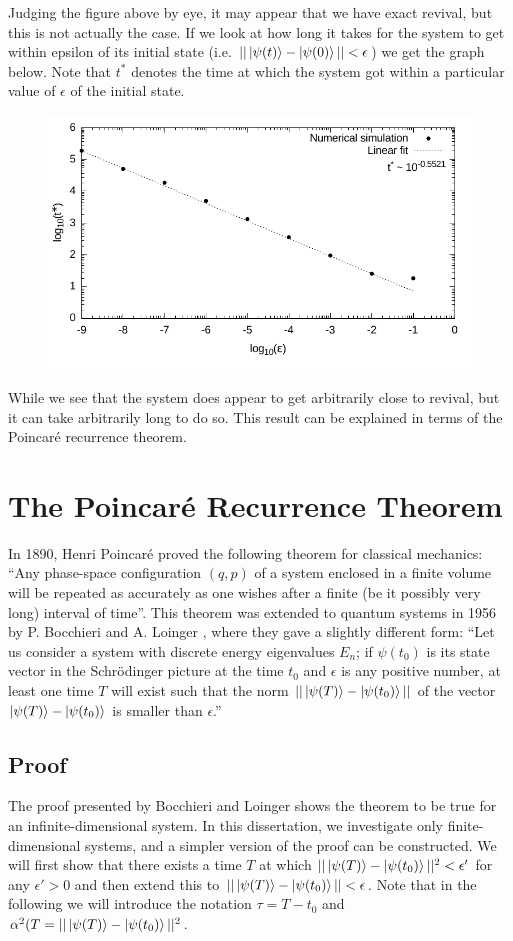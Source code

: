 \documentclass[a4paper,10pt]{article}
\begin{document}
Judging the figure above by eye, it may appear that we have exact revival, but this is not actually the case. If we look at how long it takes for the system to get within epsilon of
its initial state (i.e. $||\ket{\psi(t)}-\ket{\psi(0)}||<\epsilon$)
we get the graph below. Note that $t^*$ denotes the time at which the system got within a particular value of $\epsilon$ of the initial state.
\begin{figure}[H]
 \includegraphics[width=1.0\textwidth]{recurrence_times}
 \centering
\end{figure}
While we see that the system does appear to get arbitrarily close to revival, but it can take arbitrarily long to do so. This result can be explained in terms of the Poincar\'e recurrence theorem.
\newpage
\section{The Poincar\'e Recurrence Theorem}

In 1890, Henri Poincar\'e proved the following theorem for classical mechanics: ``Any phase-space configuration $(q,p)$ of a system enclosed in a finite volume will be repeated as accurately as one wishes
after a finite (be it possibly very long) interval of time''. This theorem was extended to quantum systems in 1956 by P. Bocchieri and A. Loinger \cite{Bocchieri1957}, where they gave a slightly different
form: ``Let us consider a system with discrete energy eigenvalues $E_n$; if $\psi(t_0)$ is its state vector in the Schr{\"o}dinger picture at the time $t_0$ and $\epsilon$ is any positive number, at 
least one time $T$ will exist such that the norm $||\ket{\psi(T)}-\ket{\psi(t_0)}||$ of the vector $\ket{\psi(T)}-\ket{\psi(t_{0})}$ is smaller than $\epsilon$.''

\subsection{Proof}
The proof presented by Bocchieri and Loinger shows the theorem to be true for an infinite-dimensional system. In this dissertation, we investigate only finite-dimensional systems, and a simpler version of 
the proof can be constructed. We will first show that there exists a time $T$ at which $||\ket{\psi(T)}-\ket{\psi(t_0)}||^2<\epsilon'$ for any $\epsilon'>0$ and then extend this to $||\ket{\psi(T)}-\ket{\psi(t_0)}||<\epsilon$. Note that in
the following we will introduce the notation $\tau=T-t_0$ and $\alpha^2(T=||\ket{\psi(T)}-\ket{\psi(t_0)}||^2$.
\end{document}
